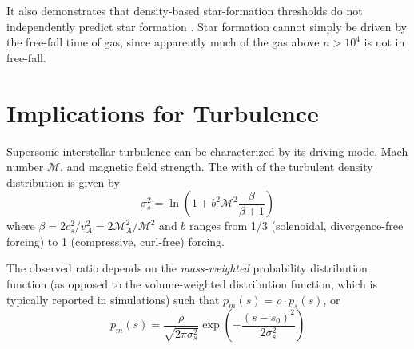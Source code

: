 It also demonstrates that density-based star-formation thresholds do not
independently predict star formation \citep{Parmentier2011a}.  Star formation
cannot simply be driven by the free-fall time of gas, since apparently much of
the gas above $n>10^4$ \percc is not in free-fall.

%



\section{Implications for Turbulence}
Supersonic interstellar turbulence can be characterized by its driving mode,
Mach number $\mathcal{M}$, and magnetic field strength.  The with of the turbulent density distribution
is given by
\begin{equation}
    \sigma_s^2 = \ln\left(1+b^2 \mathcal{M}^2 \frac{\beta}{\beta+1}\right)
\end{equation}
where $\beta= 2 c_s^2/v_A^2 = 2 \mathcal{M}_A^2/\mathcal{M}^2$ and $b$ ranges
from 1/3 (solenoidal, divergence-free forcing) to 1 (compressive, curl-free)
forcing.

The observed \formaldehyde ratio depends on the \emph{mass-weighted}
probability distribution function (as opposed to the volume-weighted
distribution function, which is typically reported in simulations)
such that $p_m(s) = \rho \cdot p_s(s)$, or
\begin{equation}
    p_m(s) = \frac{\rho}{\sqrt{2 \pi \sigma_s^2}} \exp{\left(-\frac{(s-s_0)^2}{2 \sigma_s^2}\right)}
\end{equation}

